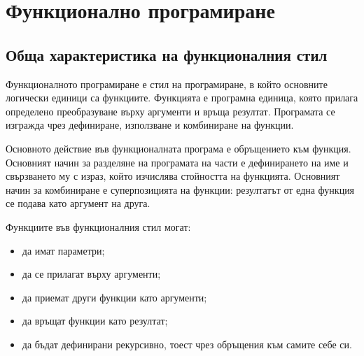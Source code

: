 \begin{konspekt}
\end{konspekt}

\section{Функционално програмиране}\label{s:19.1}

\subsection{Обща характеристика на функционалния стил}\label{s:19.1.1}

\begin{defn}
Функционалното програмиране е стил на програмиране, в който основните логически единици са функциите. Функцията е програмна единица, която прилага определено преобразуване върху аргументи и връща резултат. Програмата се изгражда чрез дефиниране, използване и комбиниране на функции.
\end{defn}

Основното действие във функционалната програма е обръщението към функция. Основният начин за разделяне на програмата на части е дефинирането на име и свързването му с израз, който изчислява стойността на функцията. Основният начин за комбиниране е суперпозицията на функции: резултатът от една функция се подава като аргумент на друга.

Функциите във функционалния стил могат:

\begin{itemize}
    \item да имат параметри;
    \item да се прилагат върху аргументи;
    \item да приемат други функции като аргументи;
    \item да връщат функции като резултат;
    \item да бъдат дефинирани рекурсивно, тоест чрез обръщения към самите себе си.
\end{itemize}

